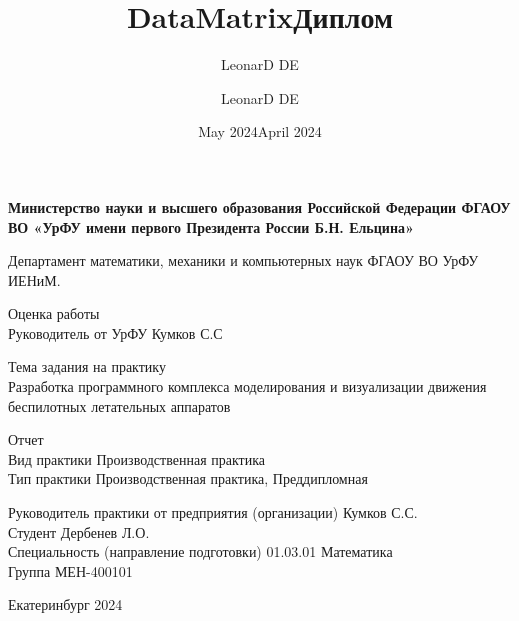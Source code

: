\documentclass[a4paper,12pt]{article}
\title{DataMatrix}
\author{LeonarD DE}
\date{May 2024}
\title{Диплом}
\author{LeonarD DE}
\date{April 2024}
\begin{document}
\begin{titlepage}

\begin{center}
{\bfseries Министерство науки и высшего образования Российской Федерации ФГАОУ ВО «УрФУ имени первого Президента России Б.Н. Ельцина»}
\end{center}
\begin{center}
Департамент математики, механики и компьютерных наук ФГАОУ ВО УрФУ ИЕНиМ.
\end{center}

\vspace{15mm}

\begin{flushright}
Оценка работы
\makebox[2in]{\hrulefill}\\
Руководитель от УрФУ Кумков С.С
\end{flushright}

\vspace{20mm}

\begin{center}
{\large Тема задания на практику}\\
\vspace{2mm}
Разработка программного комплекса моделирования и визуализации движения беспилотных летательных аппаратов
\end{center}

\vspace{2mm}

\begin{center}
{\large Отчет} \\
Вид практики Производственная практика\\
Тип практики Производственная практика, Преддипломная
\end{center}
\vspace{30mm}
\begin{flushleft}
Руководитель практики от предприятия (организации) Кумков С.С.\\
Студент Дербенев Л.О.\\
Специальность (направление подготовки) 01.03.01 Математика \\
Группа МЕН-400101
\end{flushleft}

\vspace{20mm}
\begin{center}
Екатеринбург 2024
\end{center}

\end{titlepage}
\end{document}
